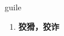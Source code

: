 
\begin{frame}
{\huge guile}
\begin{center}
\begin{enumerate}\Large
  \item \textbf{狡猾，狡诈}
\end{enumerate}
\end{center}
\end{frame}
